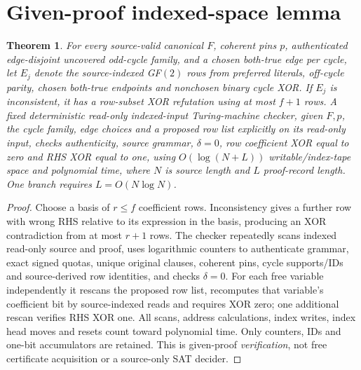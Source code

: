 \documentclass[10pt]{article}
\newtheorem{theorem}{Theorem}
\begin{document}
\section{Given-proof indexed-space lemma}
\begin{theorem}
For every source-valid canonical $F$, coherent pins $p$, authenticated edge-disjoint uncovered odd-cycle family, and a chosen both-true edge per cycle, let $E_j$ denote the source-indexed GF$(2)$ rows from preferred literals, off-cycle parity, chosen both-true endpoints and nonchosen binary cycle XOR. If $E_j$ is inconsistent, it has a row-subset XOR refutation using at most $f+1$ rows. A fixed deterministic read-only indexed-input Turing-machine checker, given $F,p$, the cycle family, edge choices and a proposed row list explicitly on its read-only input, checks authenticity, source grammar, $\delta=0$, row coefficient XOR equal to zero and RHS XOR equal to one, using $O(\log(N+L))$ writable/index-tape space and polynomial time, where $N$ is source length and $L$ proof-record length. One branch requires $L=O(N\log N)$.
\end{theorem}
\begin{proof}
Choose a basis of $r\le f$ coefficient rows. Inconsistency gives a further row with wrong RHS relative to its expression in the basis, producing an XOR contradiction from at most $r+1$ rows. The checker repeatedly scans indexed read-only source and proof, uses logarithmic counters to authenticate grammar, exact signed quotas, unique original clauses, coherent pins, cycle supports/IDs and source-derived row identities, and checks $\delta=0$. For each free variable independently it rescans the proposed row list, recomputes that variable's coefficient bit by source-indexed reads and requires XOR zero; one additional rescan verifies RHS XOR one. All scans, address calculations, index writes, index head moves and resets count toward polynomial time. Only counters, IDs and one-bit accumulators are retained. This is given-proof \emph{verification}, not free certificate acquisition or a source-only SAT decider.
\end{proof}
\end{document}
